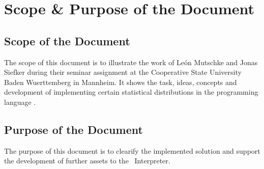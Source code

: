 

\chapter*{Scope \& Purpose of the Document}

\section*{Scope of the Document}
	The scope of this document is to illustrate the work of Le\'{o}n Mutschke and Jonas Siefker during their seminar assignment at the Cooperative State University Baden Wuerttemberg in Mannheim. It shows the task, ideas, concepts and development of implementing certain statistical distributions in the programming language \setlx.

\section*{Purpose of the Document}
	The purpose of this document is to clearify the implemented solution and support the development of further assets to the \setlx\ Interpreter.